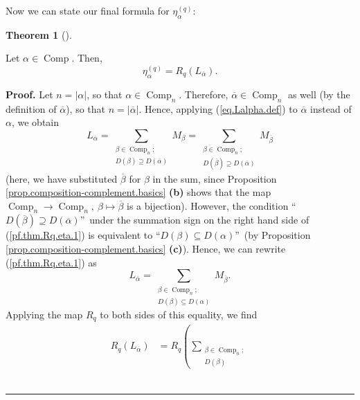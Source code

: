 \documentclass[numbers=enddot,12pt,final,onecolumn,notitlepage]{scrartcl}%
\theoremstyle{definition}
\newtheorem{theo}{Theorem}[section]
\newenvironment{theorem}[1][]
{\begin{theo}[#1]\begin{leftbar}}
{\end{leftbar}\end{theo}}
\newenvironment{proof}[1][Proof]{\noindent\textbf{#1.} }{\ \rule{0.5em}{0.5em}}
\let\sumnonlimits\sum
\renewcommand{\sum}{\sumnonlimits\limits}
\begin{document}
Now we can state our final formula for $\eta_{\alpha}^{\left(  q\right)  }$:

\begin{theorem}
\label{thm.Rq.eta}Let $\alpha\in\operatorname*{Comp}$. Then,
\[
\eta_{\alpha}^{\left(  q\right)  }=R_{q}\left(  L_{\overline{\alpha}}\right)
.
\]

\end{theorem}

\begin{proof}
Let $n=\left\vert \alpha\right\vert $, so that $\alpha\in\operatorname*{Comp}%
\nolimits_{n}$. Therefore, $\overline{\alpha}\in\operatorname*{Comp}%
\nolimits_{n}$ as well (by the definition of $\overline{\alpha}$), so that
$n=\left\vert \overline{\alpha}\right\vert $. Hence, applying
(\ref{eq.Lalpha.def}) to $\overline{\alpha}$ instead of $\alpha$, we obtain%
\begin{equation}
L_{\overline{\alpha}}=\sum_{\substack{\beta\in\operatorname*{Comp}%
\nolimits_{n};\\D\left(  \beta\right)  \supseteq D\left(  \overline{\alpha
}\right)  }}M_{\beta}=\sum_{\substack{\beta\in\operatorname*{Comp}%
\nolimits_{n};\\D\left(  \overline{\beta}\right)  \supseteq D\left(
\overline{\alpha}\right)  }}M_{\overline{\beta}} \label{pf.thm.Rq.eta.1}%
\end{equation}
(here, we have substituted $\overline{\beta}$ for $\beta$ in the sum, since
Proposition \ref{prop.composition-complement.basics} \textbf{(b)} shows that
the map $\operatorname*{Comp}\nolimits_{n}\rightarrow\operatorname*{Comp}%
\nolimits_{n},\ \beta\mapsto\overline{\beta}$ is a bijection). However, the
condition \textquotedblleft$D\left(  \overline{\beta}\right)  \supseteq
D\left(  \overline{\alpha}\right)  $\textquotedblright\ under the summation
sign on the right hand side of (\ref{pf.thm.Rq.eta.1}) is equivalent to
\textquotedblleft$D\left(  \beta\right)  \subseteq D\left(  \alpha\right)
$\textquotedblright\ (by Proposition \ref{prop.composition-complement.basics}
\textbf{(c)}). Hence, we can rewrite (\ref{pf.thm.Rq.eta.1}) as%
\[
L_{\overline{\alpha}}=\sum_{\substack{\beta\in\operatorname*{Comp}%
\nolimits_{n};\\D\left(  \beta\right)  \subseteq D\left(  \alpha\right)
}}M_{\overline{\beta}}.
\]
Applying the map $R_{q}$ to both sides of this equality, we find%
\begin{align*}
R_{q}\left(  L_{\overline{\alpha}}\right)   &  =R_{q}\left(  \sum
_{\substack{\beta\in\operatorname*{Comp}\nolimits_{n};\\D\left(  \beta\right)
}}
\end{align*}
\end{proof}
\end{document}
